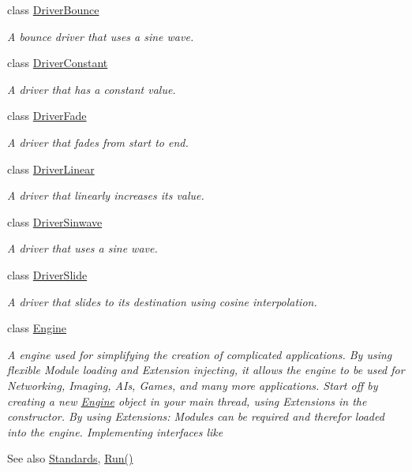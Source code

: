 \begin{DoxyCompactItemize}
class \hyperlink{class_flounder_1_1_driver_bounce}{Driver\+Bounce}
\begin{DoxyCompactList}\small\item\em A bounce driver that uses a sine wave. \end{DoxyCompactList}\item 
class \hyperlink{class_flounder_1_1_driver_constant}{Driver\+Constant}
\begin{DoxyCompactList}\small\item\em A driver that has a constant value. \end{DoxyCompactList}\item 
class \hyperlink{class_flounder_1_1_driver_fade}{Driver\+Fade}
\begin{DoxyCompactList}\small\item\em A driver that fades from start to end. \end{DoxyCompactList}\item 
class \hyperlink{class_flounder_1_1_driver_linear}{Driver\+Linear}
\begin{DoxyCompactList}\small\item\em A driver that linearly increases its value. \end{DoxyCompactList}\item 
class \hyperlink{class_flounder_1_1_driver_sinwave}{Driver\+Sinwave}
\begin{DoxyCompactList}\small\item\em A driver that uses a sine wave. \end{DoxyCompactList}\item 
class \hyperlink{class_flounder_1_1_driver_slide}{Driver\+Slide}
\begin{DoxyCompactList}\small\item\em A driver that slides to its destination using cosine interpolation. \end{DoxyCompactList}\item 
class \hyperlink{class_flounder_1_1_engine}{Engine}
\begin{DoxyCompactList}\small\item\em A engine used for simplifying the creation of complicated applications. By using flexible Module loading and Extension injecting, it allows the engine to be used for Networking, Imaging, A\+Is, Games, and many more applications. Start off by creating a new \hyperlink{class_flounder_1_1_engine}{Engine} object in your main thread, using Extensions in the constructor. By using Extensions\+: Modules can be required and therefor loaded into the engine. Implementing interfaces like \begin{DoxySeeAlso}{See also}
\hyperlink{class_flounder_1_1_standards}{Standards}, \hyperlink{class_flounder_1_1_engine_afb64e3656bdacc87a776202545d5adbf}{Run()}



\end{DoxySeeAlso}
\end{DoxyCompactList}
\end{DoxyCompactItemize}
